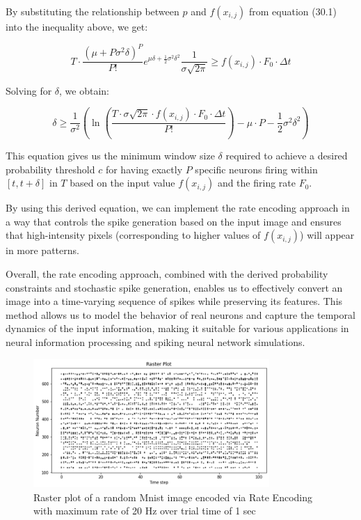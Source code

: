 By substituting the relationship between \(p\) and \(f(x_{i,j})\) from equation (30.1) into the inequality above, we get:

\begin{equation}
T \cdot \frac{(\mu + P\sigma^2\delta)^P}{P!} e^{\mu\delta + \frac{1}{2}\sigma^2 \delta^2} \frac{1}{\sigma \sqrt{2\pi}} \geq f(x_{i,j}) \cdot F_0 \cdot \Delta t
\end{equation}

Solving for \(\delta\), we obtain:

\begin{equation}
\delta \geq \frac{1}{\sigma^2}\left(\ln\left(\frac{T \cdot \sigma \sqrt{2\pi} \cdot f(x_{i,j}) \cdot F_0 \cdot \Delta t}{P!}\right) - \mu \cdot P - \frac{1}{2}\sigma^2 \delta^2\right)
\end{equation}

This equation gives us the minimum window size \(\delta\) required to achieve a desired probability threshold \(c\) for having exactly \(P\) specific neurons firing within \([t, t + \delta]\) in \(T\) based on the input value \(f(x_{i,j})\) and the firing rate \(F_0\).

By using this derived equation, we can implement the rate encoding approach in a way that controls the spike generation based on the input image and ensures that high-intensity pixels (corresponding to higher values of \(f(x_{i,j})\)) will appear in more patterns.

Overall, the rate encoding approach, combined with the derived probability constraints and stochastic spike generation, enables us to effectively convert an image into a time-varying sequence of spikes while preserving its features. This method allows us to model the behavior of real neurons and capture the temporal dynamics of the input information, making it suitable for various applications in neural information processing and spiking neural network simulations.

\begin{figure}[H]
    \centering
    \includegraphics[width=0.8\textwidth]{methods/computational-models/graphs/rate-encoding-raster.png}
    \caption{Raster plot of a random Mnist image encoded via Rate Encoding with maximum rate of 20 Hz over trial time of 1 sec}
    \label{fig:rate-encoding-raster}
\end{figure}
